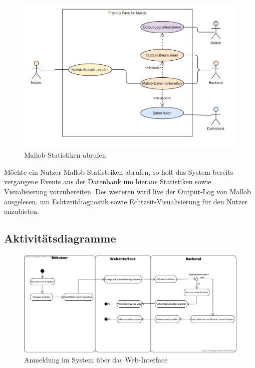 \begin{figure}[H]
    \centering
    \includegraphics[width=\textwidth]{images-interface/Mallob-visualisierung.jpg}
    \caption{Mallob-Statistiken abrufen}
\end{figure}
Möchte ein Nutzer Mallob-Statisteiken abrufen, so holt das System bereits vergangene Events aus der Datenbank um hieraus Statistiken sowie Visualisierung vorzubereiten. Des weiteren wird live der Output-Log von Mallob ausgelesen, um Echtzeitdiagnostik sowie Echtzeit-Visualisierung für den Nutzer anzubieten. 


\pagebreak

\subsection{Aktivitätsdiagramme}
\begin{figure}[H]
    \centering
    \includegraphics[width=\textwidth]{images-interface/Anmelden_Aktivitaetsdiagramm.pdf}
    \caption{Anmeldung im System über das Web-Interface}
    \label{fig:login_activity}
    
\end{figure}


